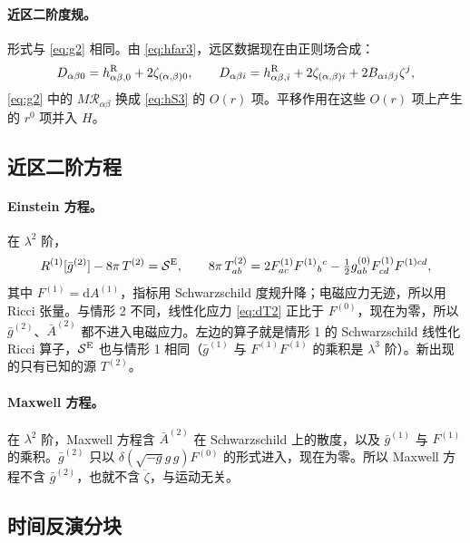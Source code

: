 \documentclass[11pt,a4paper]{ctexart}
\numberwithin{equation}{section}
\newcommand{\dd}{\mathrm d}
\begin{document}
\paragraph{近区二阶度规。}形式与 \eqref{eq:g2} 相同。由 \eqref{eq:hfar3}，远区数据现在由正则场合成：
\begin{equation}
D_{\alpha\beta0}=h^{\rm R}_{\alpha\beta,0}+2\zeta_{(\alpha,\beta)0},\qquad
D_{\alpha\beta i}=h^{\rm R}_{\alpha\beta,i}+2\zeta_{(\alpha,\beta)i}+2B_{\alpha i\beta j}\zeta^j ,
\label{eq:Ddef3}
\end{equation}
\eqref{eq:g2} 中的 $M\mathcal R_{\alpha\beta}$ 换成 \eqref{eq:hS3} 的 $O(r)$ 项。平移作用在这些 $O(r)$ 项上产生的 $r^0$ 项并入 $H$。

\subsection{近区二阶方程}
\label{sec:L3eq}

\paragraph{Einstein 方程。}在 $\lambda^2$ 阶，
\begin{equation}
R^{(1)}[\bar g^{(2)}]-8\pi\,T^{(2)}=\mathcal S^{\rm E},\qquad
8\pi\,T^{(2)}_{ab}=2F^{(1)}_{ac}F^{(1)}{}_b{}^c-\tfrac12g^{(0)}_{ab}F^{(1)}_{cd}F^{(1)cd},
\label{eq:L3second}
\end{equation}
其中 $F^{(1)}=\dd A^{(1)}$，指标用 Schwarzschild 度规升降；电磁应力无迹，所以用 Ricci 张量。与情形 2 不同，线性化应力 \eqref{eq:dT2} 正比于 $F^{(0)}$，现在为零，所以 $\bar g^{(2)}$、$\bar A^{(2)}$ 都不进入电磁应力。左边的算子就是情形 1 的 Schwarzschild 线性化 Ricci 算子，$\mathcal S^{\rm E}$ 也与情形 1 相同（$\bar g^{(1)}$ 与 $F^{(1)}F^{(1)}$ 的乘积是 $\lambda^3$ 阶）。新出现的只有已知的源 $T^{(2)}$。

\paragraph{Maxwell 方程。}在 $\lambda^2$ 阶，Maxwell 方程含 $\bar A^{(2)}$ 在 Schwarzschild 上的散度，以及 $\bar g^{(1)}$ 与 $F^{(1)}$ 的乘积。$\bar g^{(2)}$ 只以 $\delta(\sqrt{-g}g\,g)F^{(0)}$ 的形式进入，现在为零。所以 Maxwell 方程不含 $\bar g^{(2)}$，也就不含 $\ddot\zeta$，与运动无关。

\subsection{时间反演分块}
\label{sec:L3blocks}
\end{document}
